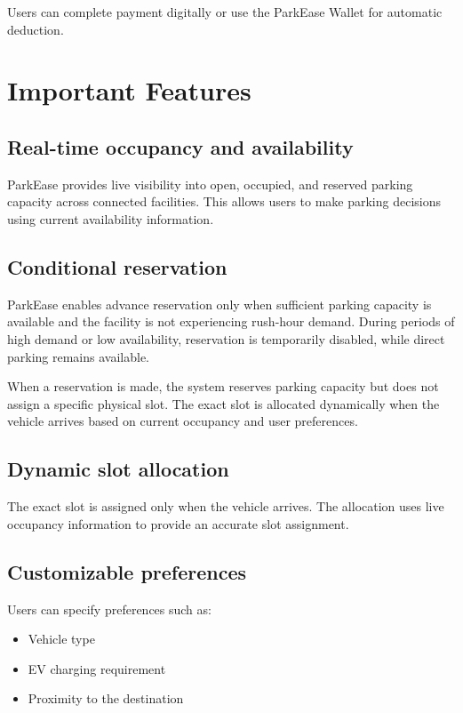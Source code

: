 \documentclass[12pt,a4paper]{article}
\begin{document}
\begin{enumerate}
Users can complete payment digitally or use the ParkEase Wallet for automatic deduction.


\section{Important Features}

\subsection{Real-time occupancy and availability}

ParkEase provides live visibility into open, occupied, and reserved parking capacity across connected facilities. This allows users to make parking decisions using current availability information.

\subsection{Conditional reservation}

ParkEase enables advance reservation only when sufficient parking capacity is available and the facility is not experiencing rush-hour demand. During periods of high demand or low availability, reservation is temporarily disabled, while direct parking remains available.

When a reservation is made, the system reserves parking capacity but does not assign a specific physical slot. The exact slot is allocated dynamically when the vehicle arrives based on current occupancy and user preferences.

\subsection{Dynamic slot allocation}

The exact slot is assigned only when the vehicle arrives. The allocation uses live occupancy information to provide an accurate slot assignment.

\subsection{Customizable preferences}

Users can specify preferences such as:

\begin{itemize}
    \item Vehicle type
    \item EV charging requirement
    \item Proximity to the destination
\end{itemize}


\end{enumerate}
\end{document}
